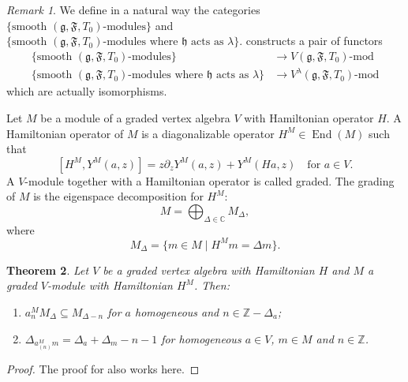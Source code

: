 \documentclass[a4paper, 12pt, reqno]{amsart}
\newtheorem{theorem}{Theorem}[subsection]
\theoremstyle{remark}
\newtheorem{remark}[theorem]{Remark}
\numberwithin{equation}{subsection}
\DeclareMathOperator{\End}{End}
\begin{document}
\begin{remark}
  \label{rmk:20}
  We define in a natural way the categories $\{\text{smooth }(\mathfrak{g}, \mathfrak{F}, T_0)\text{-modules}\}$ and $\{\text{smooth }(\mathfrak{g}, \mathfrak{F}, T_0)\text{-modules where }\mathfrak{h}\text{ acts as }\lambda\}$.
   constructs a pair of functors
  \begin{align*}
    \{\text{smooth }(\mathfrak{g}, \mathfrak{F}, T_0)\text{-modules}\} &\to V(\mathfrak{g}, \mathfrak{F}, T_0)\text{-mod} \\
    \{\text{smooth }(\mathfrak{g}, \mathfrak{F}, T_0)\text{-modules where }\mathfrak{h}\text{ acts as }\lambda\} &\to V^{\lambda}(\mathfrak{g}, \mathfrak{F}, T_0)\text{-mod}
  \end{align*}
  which are actually isomorphisms.
\end{remark}

Let $M$ be a module of a graded vertex algebra $V$ with Hamiltonian operator $H$. 
A Hamiltonian operator of $M$ is a diagonalizable operator $H^M \in \End(M)$ such that
\begin{equation}
  \label{eq:28}
  [H^M, Y^M(a, z)] = z\partial_zY^M(a, z) + Y^M(Ha, z) \quad \text{for }a \in V.
\end{equation}
A $V$-module together with a Hamiltonian operator is called graded.
The grading of $M$ is the eigenspace decomposition for $H^M$:
\begin{equation*}
  M = \bigoplus_{\Delta \in \mathbb{C}}M_{\Delta},
\end{equation*}
where
\begin{equation*}
  M_{\Delta} = \{m \in M \mid H^Mm = \Delta m\}.
\end{equation*}

\begin{theorem}
  \label{thr:22}
  Let $V$ be a graded vertex algebra with Hamiltonian $H$ and $M$ a graded $V$-module with Hamiltonian $H^M$.
  Then:
  \begin{enumerate}
  \item $a^M_nM_\Delta\subseteq M_{\Delta - n}$ for $a$ homogeneous and $n \in \mathbb{Z}-\Delta_a$;
  \item $\Delta_{a^M_{(n)}m}=\Delta_a+\Delta_m-n-1$ for homogeneous $a\in V$, $m\in M$ and $n\in \mathbb{Z}$.
  \end{enumerate}
\end{theorem}

\begin{proof}
  The proof for  also works here.
\end{proof}
\end{document}
